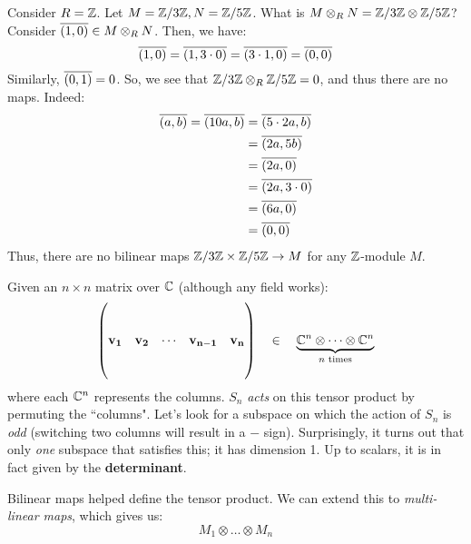 \begin{xmp}[source=Primary Source Material]
    Consider $ R = \mathbb{Z} $. Let $ M = \mathbb{Z}/3\mathbb{Z}, N = \mathbb{Z}/5\mathbb{Z} $.
    What is $ M \otimes_{R} N = \mathbb{Z}/3\mathbb{Z} \otimes \mathbb{Z}/5\mathbb{Z} $? \vsp
    Consider $ \overline{(1, 0)} \in M \otimes_{R} N $. Then, we have:
    \begin{equation*}
        \overline{(1, 0)} = \overline{(1, 3\cdot0)}
        = \overline{(3\cdot1, 0)} = \overline{(0, 0)}
    \end{equation*}
    Similarly, $ \overline{(0, 1)} = 0 $.
    So, we see that $ \mathbb{Z}/3\mathbb{Z} \otimes_{R} \mathbb{Z}/5\mathbb{Z} = 0 $,
    and thus there are no maps. Indeed:
    \begin{align*}
        \overline{(a, b)} = \overline{(10a, b)} & = \overline{(5 \cdot 2a, b)} \\
                                          & = \overline{(2a, 5b)} \\
                                          & = \overline{(2a, 0)} \\
                                          & = \overline{(2a, 3\cdot0)} \\
                                          & = \overline{(6a, 0)} \\
                                          & = \overline{(0, 0)}
    \end{align*}
    Thus, there are no bilinear maps $ \mathbb{Z}/3\mathbb{Z} \times \mathbb{Z}/5\mathbb{Z}
    \rightarrow M $ for any $ \mathbb{Z} $-module $ M $.
\end{xmp}


Given an $ n \times n $ matrix over $ \mathbb{C} $ (although any field works):
\begin{equation*}
    \begin{pmatrix}
        & & & & \\
        & & & & \\
        \mathbf{v_{1}} & \mathbf{v_{2}} & \cdots & \mathbf{v_{n-1}} & \mathbf{v_{n}} \\
        & & & & \\
        & & & &
    \end{pmatrix}
    \quad \in \quad \underbrace{\mathbb{C}^{n} \otimes \cdots \otimes \mathbb{C}^{n}}
    _{n \textrm{ times}}
\end{equation*}
where each $ \mathbb{C}^{n} $ represents the columns.
$ S_{n} $ \textit{acts} on this tensor product by permuting the ``columns".
Let's look for a subspace on which the action of $ S_{n} $ is \textit{odd}
(switching two columns will result in a $ - $ sign).
Surprisingly, it turns out that only \textit{one} subspace that satisfies this;
it has dimension 1. Up to scalars, it is in fact
given by the \textbf{determinant}.

Bilinear maps helped define the tensor product.
We can extend this to \textit{multi-linear maps}, which gives us:
\begin{equation*}
    M_{1} \otimes \dots \otimes M_{n}
\end{equation*}
